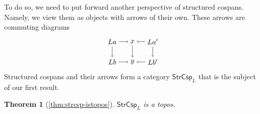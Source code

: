 \documentclass{amsart}
\newcommand{\StrCsp}{\cat{StrCsp}}
\newcommand{\cat}[1]{\mathsf{#1}}
\newtheorem*{theorem*}{Theorem}
\theoremstyle{remark}
\theoremstyle{definition}
\begin{document}
To do so, we need to put forward another perspective of structured
cospans.  Namely, we view them as objects with arrows of their own.
These arrows are commuting diagrams
%
\begin{equation} \label{eq:StrCsp-arrows}
\raisebox{-4.5ex}{
  \begin{tikzpicture}
    \node (1t) at (0,1) {$ La $};
    \node (2t) at (1,1) {$ x $};
    \node (3t) at (2,1) {$ La' $};
    \node (1b) at (0,0) {$ Lb $};
    \node (2b) at (1,0) {$ y $};
    \node (3b) at (2,0) {$ Lb' $};
    \draw [->] (1t) to node [] {\scriptsize{$  $}} (2t);
    \draw [->] (3t) to node [] {\scriptsize{$  $}} (2t);
    \draw [->] (1b) to node [] {\scriptsize{$  $}} (2b);
    \draw [->] (3b) to node [] {\scriptsize{$  $}} (2b);
    \draw [->] (1t) to node [] {\scriptsize{$  $}} (1b);
    \draw [->] (2t) to node [] {\scriptsize{$  $}} (2b);
    \draw [->] (3t) to node [] {\scriptsize{$  $}} (3b);
  \end{tikzpicture}
}
\end{equation}
%
Structured cospans and their arrows form a category $ \StrCsp_L $ that
is the subject of our first result.

\begin{theorem*}[\ref{thm:strcsp-istopos}]
  $ \StrCsp_L $ is a topos.
\end{theorem*}
\end{document}
